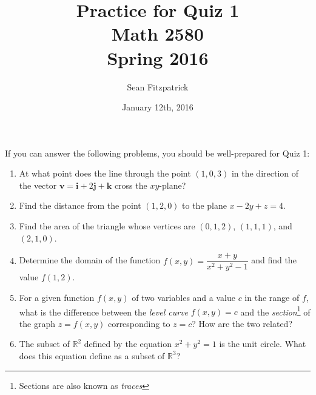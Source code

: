\documentclass[letterpaper,12pt]{article}
\title{Practice for Quiz 1\\Math 2580\\Spring 2016}
\author{Sean Fitzpatrick}
\date{January 12th, 2016}
\newcommand{\R}{\mathbb{R}}
\renewcommand{\i}{\mathbf{i}}
\renewcommand{\j}{\mathbf{j}}
\renewcommand{\k}{\mathbf{k}}
\begin{document}
 \maketitle

If you can answer the following problems, you should be well-prepared for Quiz 1:

\begin{enumerate}
 \item At what point does the line through the point $(1,0,3)$ in the direction of the vector $\mathbf{v} = \i+2\j+\k$ cross the $xy$-plane?
 \item Find the distance from the point $(1,2,0)$ to the plane $x-2y+z=4$.
 \item Find the area of the triangle whose vertices are $(0,1,2)$, $(1,1,1)$, and $(2,1,0)$.
 \item Determine the domain of the function $f(x,y) = \dfrac{x+y}{x^2+y^2-1}$ and find the value $f(1,2)$.
 \item For a given function $f(x,y)$ of two variables and a value $c$ in the range of $f$, what is the difference between the {\em level curve} $f(x,y)=c$ and the {\em section}\footnote{Sections are also known as {\em traces}} of the graph $z=f(x,y)$ corresponding to $z=c$? How are the two related?
 \item The subset of $\R^2$ defined by the equation $x^2+y^2=1$ is the unit circle. What does this equation define as a subset of $\R^3$?
\end{enumerate}
\end{document}
